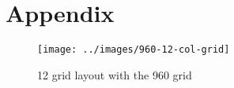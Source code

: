 \chapter*{Appendix}

\begin{figure}[h]
\caption{12 grid layout with the 960 grid}
  \label{fig:grid}
\texttt{[image: ../images/960-12-col-grid]}
\centering
\end{figure}

%
%
%
%
%